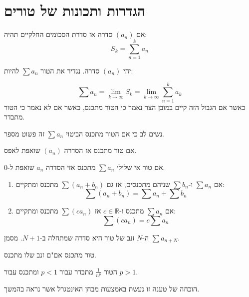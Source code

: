 \documentclass{tstextbook}
\begin{document}
\section{הגדרות ותכונות של טורים}

\begin{definition}
אם \((a_{n})\) סדרה אז סדרת הסכומים החלקיים תהיה:
$$S_{k}=\sum_{n=1}^{k} a_{n}$$

\end{definition}
\begin{definition}[טור]
יהי \((a_{n})\) סדרה. נגדיר את הטור \(\sum a_{n}\) להיות:

\end{definition}
$$\sum a_{n}=\lim_{ k \to \infty } S_{k}=\lim_{ k \to \infty } \sum_{n=1}^{k} a_{k}$$
כאשר אם הגבול הזה קיים במובן הצר נאמר כי הטור מתכנס, כאשר אם לא נאמר כי הטור מתבדר.

\begin{remark}
נשים לב כי אם הטור מתכנס הביטוי \(\sum a_{n}\) זה פשוט מספר.

\end{remark}
\begin{proposition}
אם טור מתכנס אז הסדרה \((a_{n})\) שואפת לאפס.

\end{proposition}
\begin{proposition}
אם טור אי שלילי \(\sum a_{n}\) מתכנס אזי הסדרה \(a_{n}\) שואפת ל-0.

\end{proposition}
\begin{proposition}
  \begin{enumerate}
    \item אם \(\sum a_{n}\) ו-\(\sum b_{n}\) שניהם מתכנסים, אז גם \(\sum(a_{n}+b_{n})\) מתכנס ומתקיים: 
$$\sum (a_{n}+b_{n})=\sum a_{n}+\sum b_{n}$$


    \item אם \(\sum a_{n}\) מתכנס ו-\(c \in \mathbb{R}\) אז \(\sum(ca_{n})\) מתכנס ומתקיים: 
$$\sum(c a_{n})=c \sum a_{n}$$


  \end{enumerate}
\end{proposition}
\begin{definition}
ה-\(N\) זנב של טור היא סדרה שמתחלה ב-\(N+1\). מסמן \(\sum a_{n+N}\).

\end{definition}
\begin{proposition}
טור מתכנס אם"ם זנב שלו מתכנס.

\end{proposition}
\begin{proposition}
הטור \(\frac{1}{n^{p}}\) מתבדר עבור \(p<1\) ומתכנס עבור \(p>1\).

\end{proposition}
הוכחה של טענה זו נעשת באמצעות מבחן האינטגרל אשר נראה בהמשך.
\end{document}
